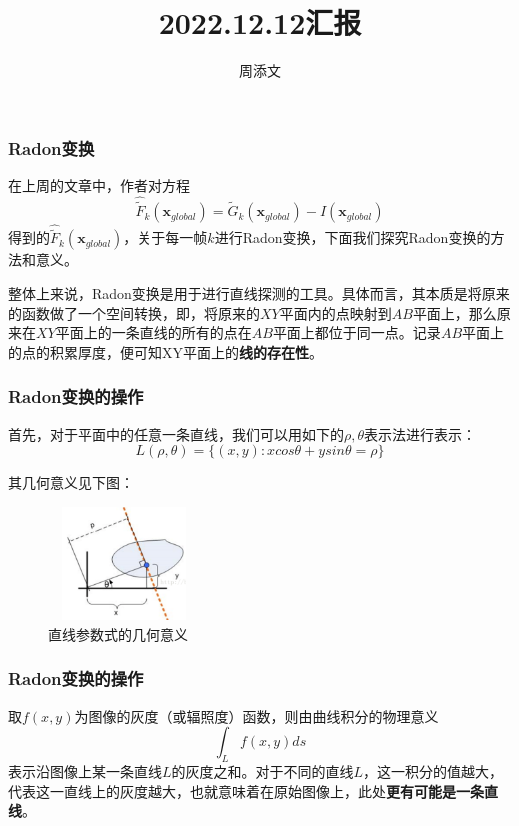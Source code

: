 \documentclass{beamer}
\title[2022.12.12日汇报] %
{2022.12.12汇报}
\author[周添文] %
{周添文\inst{} }
\institute[] %
{
  \inst{}%
  数学科学学院\\
  北京师范大学\\
}
\date[2022.12.12] %
\begin{document}
\frame{\titlepage}
\begin{frame}
\frametitle{Radon变换}
在上周的文章中，作者对方程
\begin{equation}
\hat{\widetilde{F}}_k(\textbf{x}_{global})=\widetilde{G}_k(\textbf{x}_{global})-I(\textbf{x}_{global})
\end{equation}
得到的$\hat{\widetilde{F}}_k(\textbf{x}_{global})$，关于每一帧$k$进行Radon变换，下面我们探究Radon变换的方法和意义。\pause

整体上来说，Radon变换是用于进行直线探测的工具。具体而言，其本质是将原来的函数做了一个空间转换，即，将原来的$XY$平面内的点映射到$AB$平面上，那么原来在$XY$平面上的一条直线的所有的点在$AB$平面上都位于同一点。记录$AB$平面上的点的积累厚度，便可知XY平面上的\textbf{线的存在性}。\pause 
\end{frame}
\begin{frame} 
\frametitle{Radon变换的操作}
首先，对于平面中的任意一条直线，我们可以用如下的$\rho, \theta$表示法进行表示：
\begin{equation}
L(\rho,\theta)=\{(x,y):xcos\theta +ysin\theta=\rho\}
\end{equation}\pause

其几何意义见下图：
\begin{figure}[!h]
\centering
\includegraphics[height=3cm,width=4cm]{20221209.png}
\caption{直线参数式的几何意义}
\end{figure}
\end{frame}
\begin{frame}
\frametitle{Radon变换的操作}
取$f(x,y)$为图像的灰度（或辐照度）函数，则由曲线积分的物理意义
\begin{equation}
\int_Lf(x,y)ds
\end{equation}
表示沿图像上某一条直线$L$的灰度之和。对于不同的直线$L$，这一积分的值越大，代表这一直线上的灰度越大，也就意味着在原始图像上，此处\textbf{更有可能是一条直线}。
\end{frame}
\end{document}
